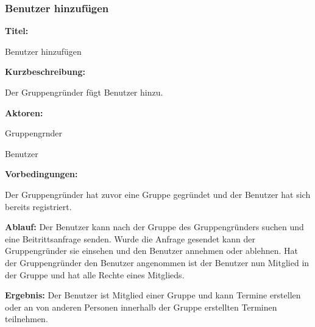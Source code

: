 \documentclass{scrartcl}
\begin{document}
	\subsubsection{Benutzer hinzufügen}
	\begin{description}
		\item \textbf{Titel:}
		\begin{description}
			\item Benutzer hinzufügen
		\end{description}
		\item \textbf{Kurzbeschreibung:}
		\begin{description}
			\item Der Gruppengründer fügt Benutzer hinzu.
		\end{description}
		\item \textbf{Aktoren:}
		\begin{description}
			\item \gls{Gruppengrnder}
			\item Benutzer
		\end{description}
		\item \textbf{Vorbedingungen:}
		\begin{description}
			\item Der Gruppengründer hat zuvor eine Gruppe gegründet und der Benutzer hat sich bereits registriert.
		\end{description}
		\item \textbf{Ablauf:} \newline Der Benutzer kann nach der Gruppe des Gruppengründers suchen und eine Beitrittsanfrage senden. Wurde die Anfrage gesendet kann der Gruppengründer sie einsehen und den Benutzer annehmen oder ablehnen. Hat der Gruppengründer den Benutzer angenommen ist der Benutzer nun \gls{Mitglied} in der Gruppe und hat alle Rechte eines Mitglieds.
		\item \textbf{Ergebnis:} \newline Der Benutzer ist \gls{Mitglied} einer Gruppe und kann Termine erstellen oder an von anderen Personen innerhalb der Gruppe erstellten Terminen teilnehmen.
	\end{description}
	
	\newpage
	
\end{document}

